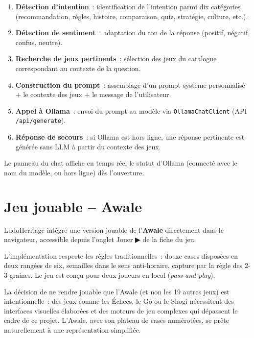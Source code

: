 \begin{enumerate}
    \item \textbf{Détection d'intention}~: identification de l'intention parmi dix catégories
          (recommandation, règles, histoire, comparaison, quiz, stratégie, culture, etc.).
    \item \textbf{Détection de sentiment}~: adaptation du ton de la réponse (positif, négatif,
          confus, neutre).
    \item \textbf{Recherche de jeux pertinents}~: sélection des jeux du catalogue correspondant
          au contexte de la question.
    \item \textbf{Construction du prompt}~: assemblage d'un prompt système personnalisé + le
          contexte des jeux + le message de l'utilisateur.
    \item \textbf{Appel à Ollama}~: envoi du prompt au modèle via \texttt{OllamaChatClient}
          (API \texttt{/api/generate}).
    \item \textbf{Réponse de secours}~: si Ollama est hors ligne, une réponse pertinente est
          générée sans LLM à partir du contexte des jeux.
\end{enumerate}

Le panneau du chat affiche en temps réel le statut d'Ollama (connecté avec le nom du modèle,
ou hors ligne) dès l'ouverture.

\section{Jeu jouable -- Awale}

LudoHeritage intègre une version jouable de l'\textbf{Awale} directement dans le navigateur,
accessible depuis l'onglet \og{}Jouer ▶\fg{} de la fiche du jeu.

L'implémentation respecte les règles traditionnelles~: douze cases disposées en deux rangées de
six, semailles dans le sens anti-horaire, capture par la règle des 2-3 graines. Le jeu est
conçu pour deux joueurs en local (\textit{pass-and-play}).

La décision de ne rendre jouable que l'Awale (et non les 19 autres jeux) est intentionnelle~:
des jeux comme les Échecs, le Go ou le Shogi nécessitent des interfaces visuelles élaborées
et des moteurs de jeu complexes qui dépassent le cadre de ce projet. L'Awale, avec son plateau
de cases numérotées, se prête naturellement à une représentation simplifiée.

